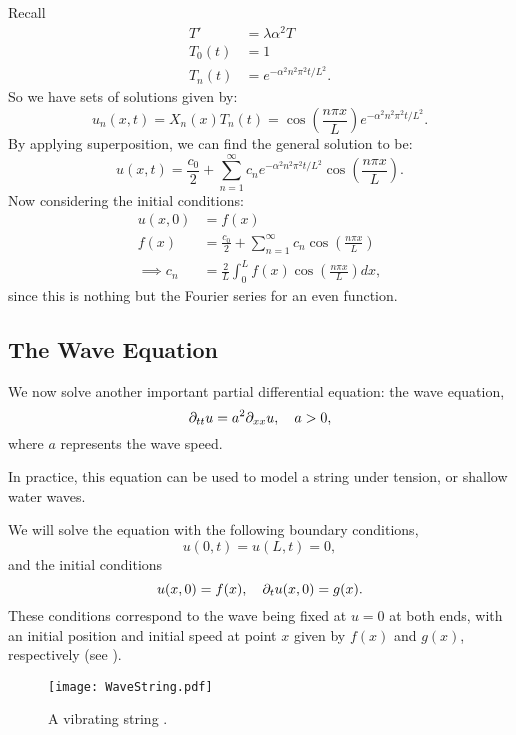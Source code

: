 Recall
\begin{align*}
	T' &= \lambda \alpha^2 T \\
	T_0(t) &= 1 \\
	T_n(t) &= e^{-\alpha^2 n^2 \pi^2 t/L^2}.
\end{align*}
So we have sets of solutions given by:
\[
u_n(x,t) = X_n(x) T_n(t) = \cos{\left(\frac{n \pi x}{L} \right)} e^{-\alpha^2 n^2 \pi^2 t/L^2}.
\]
By applying superposition, we can find the general solution to be:
\begin{equation}
	u(x,t) = \frac{c_0}{2} + \sum_{n=1}^{\infty} c_n e^{-\alpha^2 n^2 \pi^2 t/L^2} \cos{\left(\frac{n \pi x}{L} \right)}.
\end{equation}
Now considering the initial conditions:
\begin{align}
	u(x,0) & = f(x) \nonumber \\
	f(x) & = \frac{c_0}{2} + \sum_{n=1}^{\infty} c_n \cos{\left(\frac{n \pi x}{L} \right)} \nonumber \\
	\implies c_n & = \frac{2}{L} \int_0^L f(x) \cos{\left(\frac{n \pi x}{L} \right)} dx,
\end{align}
since this is nothing but the Fourier series for an even function.

\subsection{The Wave Equation}\label{sec:waveeqn}

We now solve another important partial differential equation: the wave equation,
\begin{equation}
	\partial_{tt}u = a^2 \partial_{xx}u, \quad a>0,
\end{equation}
where $a$ represents the wave speed.

In practice, this equation can be used to model a string under tension, or shallow water waves.

We will solve the equation with the following boundary conditions,
\[
u(0,t) = u(L,t) = 0,
\]
and the initial conditions
\[
u(x,0) = f(x), \quad \partial_t u(x,0) = g(x).
\]
These conditions correspond to the wave being fixed at $u=0$ at both ends, with an initial position and initial speed at point $x$ given by $f(x)$ and $g(x)$, respectively (see ).

\begin{figure}[!ht]
	\centering
	\texttt{[image: WaveString.pdf]}
	\caption{A vibrating string \cite[Figure 10.7.1]{boyce}.}
	\label{fig:wavestring}
\end{figure}

